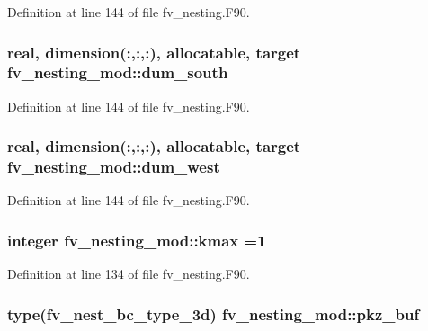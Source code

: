 Definition at line 144 of file fv\-\_\-nesting.\-F90.

\subsubsection[{dum\-\_\-south}]{\setlength{\rightskip}{0pt plus 5cm}real, dimension(\-:,\-:,\-:), allocatable, target fv\-\_\-nesting\-\_\-mod\-::dum\-\_\-south}\label{classfv__nesting__mod_aec160f65b40c51f270de9995522c6af5}


Definition at line 144 of file fv\-\_\-nesting.\-F90.

\subsubsection[{dum\-\_\-west}]{\setlength{\rightskip}{0pt plus 5cm}real, dimension(\-:,\-:,\-:), allocatable, target fv\-\_\-nesting\-\_\-mod\-::dum\-\_\-west}\label{classfv__nesting__mod_aabec65a89859cf6fddbdb0dd22eca70c}


Definition at line 144 of file fv\-\_\-nesting.\-F90.

\subsubsection[{kmax}]{\setlength{\rightskip}{0pt plus 5cm}integer fv\-\_\-nesting\-\_\-mod\-::kmax =1}\label{classfv__nesting__mod_af15ee2132be14b98ebf846e337d494f4}


Definition at line 134 of file fv\-\_\-nesting.\-F90.

\subsubsection[{pkz\-\_\-buf}]{\setlength{\rightskip}{0pt plus 5cm}type(fv\-\_\-nest\-\_\-bc\-\_\-type\-\_\-3d) fv\-\_\-nesting\-\_\-mod\-::pkz\-\_\-buf}\label{classfv__nesting__mod_acddea4741cfe6597c8dd8a6a8d5eea24}


